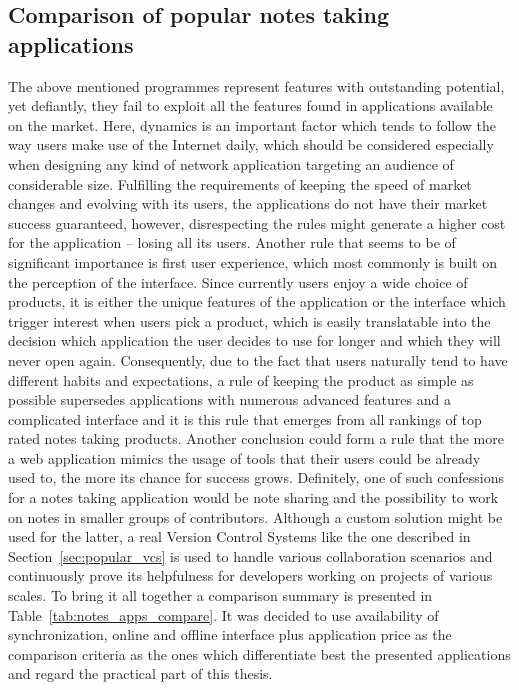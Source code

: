 \subsection{Comparison of popular notes taking applications}\label{subsec:vcs_comparison}
The above mentioned programmes represent features with outstanding potential, yet defiantly, they fail to exploit all the features found in applications available on the market. Here, dynamics is an important factor which tends to follow the way users make use of the Internet daily, which should be considered especially when designing any kind of network application targeting an audience of considerable size. Fulfilling the requirements of keeping the speed of market changes and evolving with its users, the applications do not have their market success guaranteed, however, disrespecting the rules might generate a higher cost for the application -- losing all its users. Another rule that seems to be of significant importance is first user experience, which most commonly is built on the perception of the interface. Since currently users enjoy a wide choice of products, it is either the unique features of the application or the interface which trigger interest when users pick a product, which is easily translatable into the decision which application the user decides to use for longer and which they will never open again. Consequently, due to the fact that users naturally tend to have different habits and expectations, a rule of keeping the product as simple as possible supersedes applications with numerous advanced features and a complicated interface and it is this rule that emerges from all rankings of top rated notes taking products. Another conclusion could form a rule that the more a web application mimics the usage of tools that their users could be already used to, the more its chance for success grows. Definitely, one of such confessions for a notes taking application would be note sharing and the possibility to work on notes in smaller groups of contributors. Although a custom solution might be used for the latter, a real Version Control Systems like the one described in Section~\ref{sec:popular_vcs} is used to handle various collaboration scenarios and continuously prove its helpfulness for developers working on projects of various scales. To bring it all together a comparison summary is presented in Table~\ref{tab:notes_apps_compare}.  It was decided to use availability of synchronization, online and offline interface plus application price as the comparison criteria as the ones which differentiate best the presented applications and regard the practical part of this thesis.   
